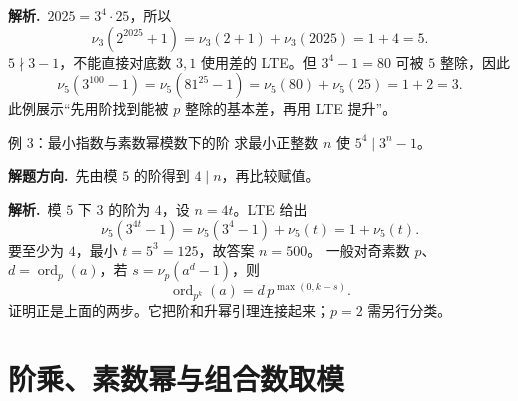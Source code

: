 \documentclass[UTF8,a4paper,11pt,oneside,openany,fontset=fandol]{ctexbook}
\theoremstyle{definition}
\newcommand{\ord}{\operatorname{ord}}
\newcommand{\sol}{\par\noindent\textbf{解析.}\ }
\newcommand{\hint}{\par\noindent\textbf{解题方向.}\ }
\begin{document}
\sol $2025=3^4\cdot25$，所以
\[
\nu_3(2^{2025}+1)=\nu_3(2+1)+\nu_3(2025)=1+4=5.
\]
$5\nmid3-1$，不能直接对底数 $3,1$ 使用差的 LTE。但 $3^4-1=80$ 可被 $5$ 整除，因此
\[
\nu_5(3^{100}-1)=\nu_5(81^{25}-1)=\nu_5(80)+\nu_5(25)=1+2=3.
\]
此例展示“先用阶找到能被 $p$ 整除的基本差，再用 LTE 提升”。


\begin{problem}{例 3：最小指数与素数幂模数下的阶}
求最小正整数 $n$ 使 $5^4\mid3^n-1$。
\end{problem}
\hint 先由模 $5$ 的阶得到 $4\mid n$，再比较赋值。

\sol 模 $5$ 下 $3$ 的阶为 $4$，设 $n=4t$。LTE 给出
\[
 \nu_5(3^{4t}-1)=\nu_5(3^4-1)+\nu_5(t)=1+\nu_5(t).
\]
要至少为 $4$，最小 $t=5^3=125$，故答案 $n=500$。
一般对奇素数 $p$、$d=\ord_p(a)$，若 $s=\nu_p(a^d-1)$，则
\[
 \ord_{p^k}(a)=d\,p^{\max(0,k-s)}.
\]
证明正是上面的两步。它把阶和升幂引理连接起来；$p=2$ 需另行分类。



\chapter{阶乘、素数幂与组合数取模}
\end{document}
